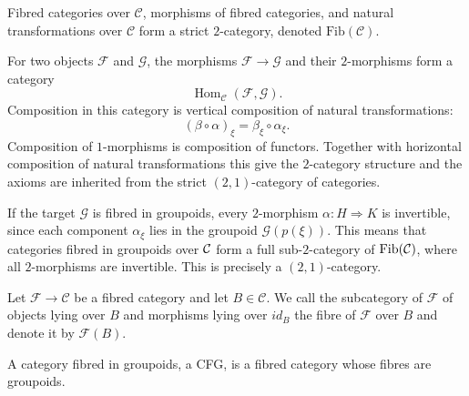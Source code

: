 \begin{remark}
	\label{rem:2-category-fibred-categories}
	Fibred categories over $\mathcal{C}$, morphisms of fibred
	categories, and natural transformations over $\mathcal{C}$
	form a strict $2$-category, denoted
	$\mathrm{Fib}(\mathcal{C})$.
	
	For two objects $\mathcal{F}$ and $\mathcal{G}$, the
	morphisms $\mathcal{F}\to\mathcal{G}$ and their
	$2$-morphisms form a category
	\[
	\operatorname{Hom}_{\mathcal C}(\mathcal{F},\mathcal{G}).
	\]
	Composition in this category is vertical composition
	of natural transformations:
	\[
	(\beta\circ\alpha)_\xi
	=
	\beta_\xi\circ\alpha_\xi.
	\]
	Composition of $1$-morphisms is composition of functors.
	Together with horizontal composition of natural
	transformations this give the
	$2$-category structure and the axioms are inherited from
	the strict $(2, 1)$-category of categories.
	
	If the target $\mathcal{G}$ is fibred in groupoids,
	every $2$-morphism $\alpha:H\Rightarrow K$ is invertible, since
	each component $\alpha_\xi$ lies in the groupoid
	$\mathcal{G}(p(\xi))$. This means that categories fibred in groupoids over
	$\mathcal{C}$ form a full sub-$2$-category of
	$\mathrm{Fib}(\mathcal{C})$, where all $2$-morphisms
	are invertible. This is precisely a $(2,1)$-category.
\end{remark}

\begin{definition}
	Let $\mathcal{F}\to \mathcal{C}$ be a fibred category and let $B\in \mathcal{C}$. We call the subcategory of $\mathcal{F}$ of objects lying over $B$ and morphisms lying over $id_B$ the fibre of $\mathcal{F}$ over $B$ and denote it by $\mathcal{F}(B)$.
\end{definition}

\begin{definition}
	\label{def:category-fibred-in-groupoids}
	A category fibred in groupoids, a CFG,
	is a fibred category whose fibres are groupoids.
\end{definition}

